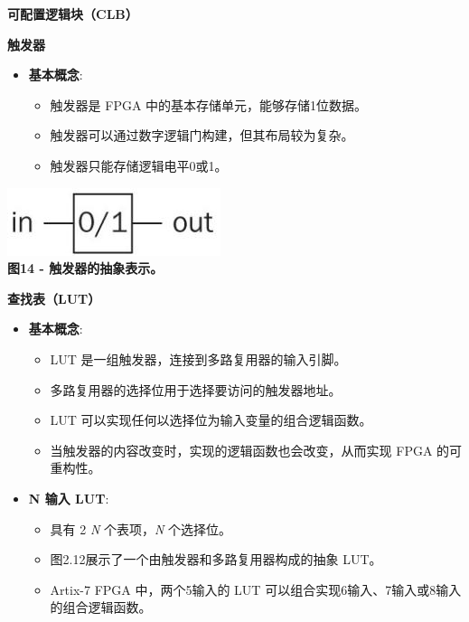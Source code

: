 \begin{frame}[allowframebreaks]{\textbf{可配置逻辑块（CLB）}}
\begin{block}{\textbf{触发器}}
\begin{itemize}
\tightlist
\item
    \textbf{基本概念}:

    \begin{itemize}
    \tightlist
    \item
    触发器是 FPGA 中的基本存储单元，能够存储1位数据。
    \item
    触发器可以通过数字逻辑门构建，但其布局较为复杂。
    \item
    触发器只能存储逻辑电平0或1。
    \end{itemize}
\end{itemize}

\includegraphics[keepaspectratio]{img1/XC7A35TFF.jpeg}\\
\textbf{图14 - 触发器的抽象表示。}
\end{block}

\begin{block}{\textbf{查找表（LUT）}}
\begin{itemize}
\tightlist
\item
    \textbf{基本概念}:

    \begin{itemize}
    \tightlist
    \item
    LUT 是一组触发器，连接到多路复用器的输入引脚。
    \item
    多路复用器的选择位用于选择要访问的触发器地址。
    \item
    LUT 可以实现任何以选择位为输入变量的组合逻辑函数。
    \item
    当触发器的内容改变时，实现的逻辑函数也会改变，从而实现 FPGA
    的可重构性。
    \end{itemize}
\item
    \textbf{N 输入 LUT}:

    \begin{itemize}
    \tightlist
    \item
    具有 2 \emph{N} 个表项，\emph{N} 个选择位。
    \item
    图2.12展示了一个由触发器和多路复用器构成的抽象 LUT。
    \item
    Artix-7 FPGA 中，两个5输入的 LUT
    可以组合实现6输入、7输入或8输入的组合逻辑函数。
    \end{itemize}
\end{itemize}


\end{block}
\end{frame}
